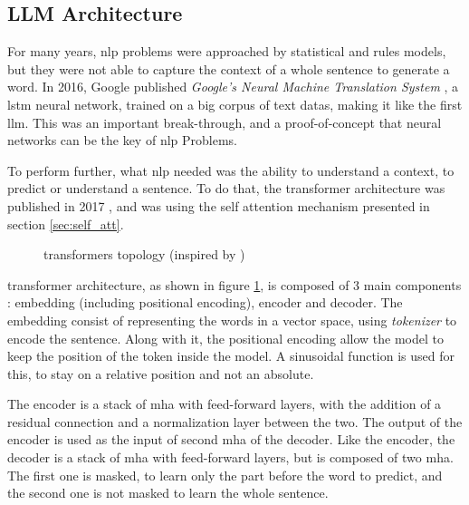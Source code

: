 
\subsection{LLM Architecture}
\label{sec:llm_arch}
For many years, \acrshort{nlp} problems were approached by statistical and rules models, but they were not able to capture the context of a whole sentence to generate a word. In 2016, Google published \textit{Google's Neural Machine Translation System} \cite{wu_googles_2016}, a \gls{lstm} neural network, trained on a big corpus of text datas, making it like the first \acrlong{llm}. This was an important break-through, and a proof-of-concept that neural networks can be the key of \gls{nlp} Problems.

To perform further, what \acrshort{nlp} needed was the ability to understand a context, to predict or understand a sentence. To do that, the \gls{transformer} architecture was published in 2017 \cite{vaswani_attention_2017}, and was using the self attention mechanism presented in section \ref{sec:self_att}. 

\begin{figure}[h]
    \centering
    
    \caption{\Glspl{transformer} topology (inspired by \cite{vaswani_attention_2017})}
    \label{fig:transformers}
\end{figure}

\Gls{transformer} architecture, as shown in figure \ref{fig:transformers}, is composed of 3 main components : embedding (including positional encoding), encoder and decoder. The embedding consist of representing the words in a vector space, using \textit{tokenizer} to encode the sentence.  Along with it, the positional encoding allow the model to keep the position of the token inside the model. A sinusoidal function is used for this, to stay on a relative position and not an absolute.

The encoder is a stack of \acrshort{mha} with feed-forward layers, with the addition of a residual connection and a normalization layer between the two. The output of the encoder is used as the input of second \acrshort{mha} of the decoder. Like the encoder, the decoder is a stack of \acrshort{mha} with feed-forward layers, but is composed of two \acrshort{mha}. The first one is masked, to learn only the part before the word to predict, and the second one is not masked to learn the whole sentence.

